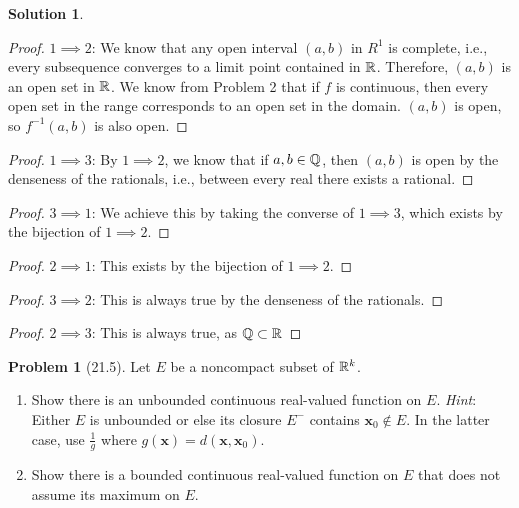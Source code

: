 \documentclass[12pt]{article}
\theoremstyle{definition} %
\newtheorem{solution}{Solution}
\newtheorem{problem}{Problem}
\theoremstyle{plain} %
\begin{document}
\begin{solution}
  \begin{proof}  
    \(1\implies 2\): We know that any open interval \((a,b)\) in \(R^{1}\) is complete, i.e., every subsequence converges to a limit point contained in \(\mathbb{\MakeUppercase{r}}\). Therefore, \((a,b)\) is an open set in \(\mathbb{\MakeUppercase{r}}\). We know from Problem 2 that if \(f\) is continuous, then every open set in the range corresponds to an open set in the domain. \((a,b)\) is open, so \(f^{-1}(a,b)\) is also open.    
    \end{proof}
\begin{proof}  
\(1\implies 3\): By \(1\implies 2\), we know that if \(a,b\in \mathbb{\MakeUppercase{q}} \), then \((a,b)\) is open by the denseness of the rationals, i.e., between every real there exists a rational.  
\end{proof}
\begin{proof}  
\(3\implies 1\): We achieve this by taking the converse of \(1\implies 3\), which exists by the bijection of \(1\implies 2\).
\end{proof}

\begin{proof}  
\(2\implies 1\): This exists by the bijection of \(1\implies 2\).  
\end{proof}
\begin{proof}  
\(3\implies 2\): This is always true by the denseness of the rationals.
\end{proof}
\begin{proof}  
\(2\implies 3\): This is always true, as \(\mathbb{\MakeUppercase{q}} \subset \mathbb{\MakeUppercase{r}}\) 
\end{proof}
\end{solution}
\begin{problem}[21.5]
  Let \(E\) be a noncompact subset of \(\mathbb{\MakeUppercase{r}}^{k}\).
  \begin{enumerate}
    \item Show there is an unbounded continuous real-valued function on \(E\). \emph{Hint}: Either \(E\) is unbounded or else its closure \(E^{-}\) contains \(\mathbf{x}_{0} \notin E\). In the latter case, use \(\frac{1}{g}\) where \(g(\mathbf{x}) =d(\mathbf{x},\mathbf{x}_{0})\).
    \item Show there is a bounded continuous real-valued function on \(E\) that does not assume its maximum on \(E\).
  \end{enumerate}
\end{problem}
\end{document}
